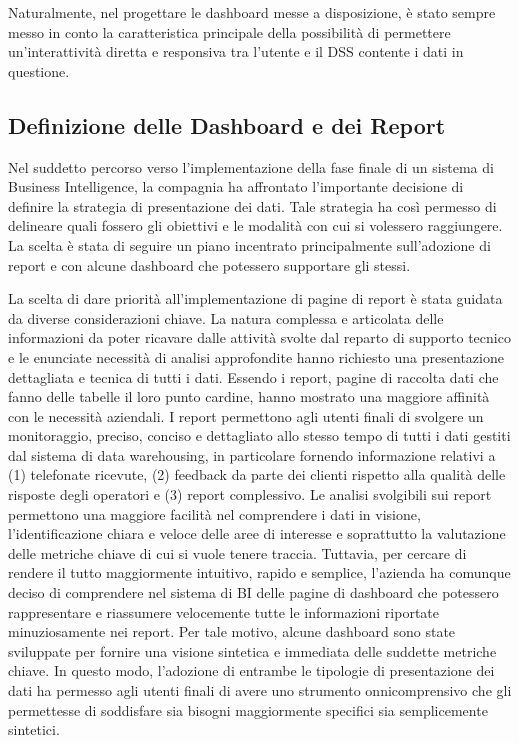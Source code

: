 Naturalmente, nel progettare le dashboard messe a disposizione, è stato sempre messo in conto la caratteristica principale della possibilità di permettere un'interattività diretta e responsiva tra l'utente e il DSS contente i dati in questione.

\subsection{Definizione delle Dashboard e dei Report}
Nel suddetto percorso verso l'implementazione della fase finale di un sistema di Business Intelligence, la compagnia ha affrontato l'importante decisione di definire la strategia di presentazione dei dati. Tale strategia ha così permesso di delineare quali fossero gli obiettivi e le modalità con cui si volessero raggiungere. La scelta è stata di seguire un piano incentrato principalmente sull'adozione di report e con alcune dashboard che potessero supportare gli stessi.

La scelta di dare priorità all'implementazione di pagine di report è stata guidata da diverse considerazioni chiave. La natura complessa e articolata delle informazioni da poter ricavare dalle attività svolte dal reparto di supporto tecnico e le enunciate necessità di analisi approfondite hanno richiesto una presentazione dettagliata e tecnica di tutti i dati. Essendo i report, pagine di raccolta dati che fanno delle tabelle il loro punto cardine, hanno mostrato una maggiore affinità con le necessità aziendali. I report permettono agli utenti finali di svolgere un monitoraggio, preciso, conciso e dettagliato allo stesso tempo di tutti i dati gestiti dal sistema di data warehousing, in particolare fornendo informazione relativi a (1) telefonate ricevute, (2) feedback da parte dei clienti rispetto alla qualità delle risposte degli operatori e (3) report complessivo. Le analisi svolgibili sui report permettono una maggiore facilità nel comprendere i dati in visione, l'identificazione chiara e veloce delle aree di interesse e soprattutto la valutazione delle metriche chiave di cui si vuole tenere traccia. Tuttavia, per cercare di rendere il tutto maggiormente intuitivo, rapido e semplice, l'azienda ha comunque deciso di comprendere nel sistema di BI delle pagine di dashboard che potessero rappresentare e riassumere velocemente tutte le informazioni riportate minuziosamente nei report. Per tale motivo, alcune dashboard sono state sviluppate per fornire una visione sintetica e immediata delle suddette metriche chiave. In questo modo, l'adozione di entrambe le tipologie di presentazione dei dati ha permesso agli utenti finali di avere uno strumento onnicomprensivo che gli permettesse di soddisfare sia bisogni maggiormente specifici sia semplicemente sintetici.

